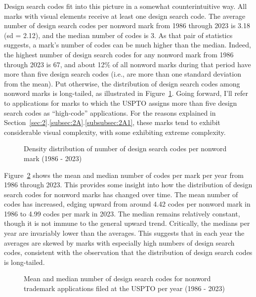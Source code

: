 \documentclass[letterpaper, 11pt, oneside]{article}
\begin{document}
Design search codes fit into this picture in a somewhat counterintuitive way. All marks with visual elements receive at least one design search code. The average number of design search codes per nonword mark from 1986 through 2023 is 3.18 (sd = 2.12), and the median number of codes is 3. As that pair of statistics suggests, a mark's number of codes can be much higher than the median. Indeed, the highest number of design search codes for any nonword mark from 1986 through 2023 is 67, and about 12\% of all nonword marks during that period have more than five design search codes (i.e., are more than one standard deviation from the mean). Put otherwise, the distribution of design search codes among nonword marks is long-tailed, as illustrated in Figure~\ref{fig:4}. Going forward, I'll refer to applications for marks to which the USPTO assigns more than five design search codes as ``high-code'' applications. For the reasons explained in Section~\ref{sec:2}.\ref{subsec:2A}.\ref{subsubsec:2A1}, these marks tend to exhibit considerable visual complexity, with some exhibiting extreme complexity.

\begin{figure}[H]
\centering

\caption{\label{fig:4} Density distribution of number of design search codes per nonword mark (1986 - 2023)}
\end{figure}

Figure~\ref{fig:5} shows the mean and median number of codes per mark per year from 1986 through 2023. This provides some insight into how the distribution of design search codes for nonword marks has changed over time. The mean number of codes has increased, edging upward from around 4.42 codes per nonword mark in 1986 to 4.99 codes per mark in 2023. The median remains relatively constant, though it is not immune to the general upward trend. Critically, the medians per year are invariably lower than the averages. This suggests that in each year the averages are skewed by marks with especially high numbers of design search codes, consistent with the observation that the distribution of design search codes is long-tailed.

\begin{figure}[H]
\centering

\caption{\label{fig:5} Mean and median number of design search codes for nonword trademark applications filed at the USPTO per year (1986 - 2023)}
\end{figure}
\end{document}
